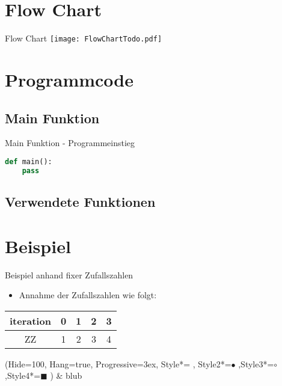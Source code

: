 \section{Flow Chart}
\begin{frame}{Flow Chart}
	\centering
  	\texttt{[image: FlowChartTodo.pdf]}
\end{frame}

\section{Programmcode}
\subsection{Main Funktion}
\begin{frame}[fragile]{Main Funktion - Programmeinstieg}
  \begin{lstlisting}[language=python]
def main():
	pass
\end{lstlisting}
\logopythonbottom
\end{frame}

\subsection{Verwendete Funktionen}
%
%


\section{Beispiel}
\begin{frame}[fragile]{Beispiel anhand fixer Zufallszahlen}
\begin{itemize}
\item Annahme der Zufallszahlen wie folgt:
\end{itemize}
\begin{center}
  \begin{tabular}{c|c|c|c|c}
  \hline 
  iteration & 0 & 1 & 2 & 3\\ 
  \hline 
  ZZ      & 1 & 2 & 3 & 4 \\ 
  \end{tabular} 
\end{center}
\begin{easylist}
\ListProperties(Hide=100, Hang=true, Progressive=3ex, Style*= ,
Style2*=$\bullet$ ,Style3*=$\circ$ ,Style4*=\tiny$\blacksquare$ )
& blub
\end{easylist}
\end{frame}


